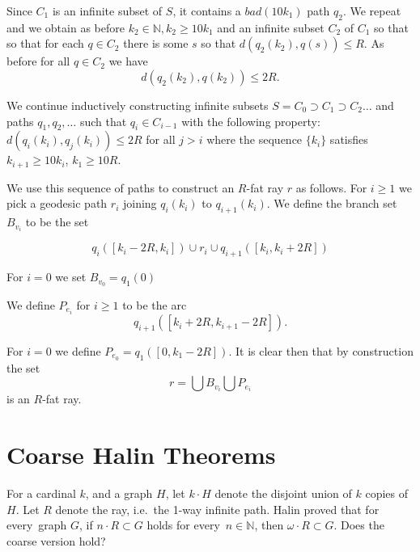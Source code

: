 \documentclass[a4paper]{article}
\newcommand{\comment}[1]{}
\newtheorem{lemma}[proposition]{Lemma}
\newcommand{\N}{\ensuremath{\mathbb N}}
\newcommand{\nin}{\ensuremath{{n\in\N}}}
\newcommand{\Lr}[1]{Lemma~\ref{#1}}
\newcommand{\Cnr}[1]{Con\-jecture~\ref{#1}}
\newcommand{\fe}{for every}
\begin{document}
{Since $C_1$ is an infinite subset of $S$, it contains a $bad(10k_1)$ path $q_2$. We repeat
and we obtain as before $k_2\in \mathbb N, k_2\geq 10k_1$ and an infinite subset $C_2$ of $C_1$ so that
so that for each $q\in C_2$ there is some $s$ so that
$d(q_2(k_2),q(s))\leq R$. As before for all $q\in C_2$ we have
$$d(q_2(k_2),q(k_2))\leq 2R.$$

We continue inductively constructing infinite subsets $S=C_0\supset C_1\supset C_2 \ldots$
and paths $q_1,q_2,\ldots$ such that $q_i\in C_{i-1}$  with the following property:
$d(q_i(k_i),q_j(k_i))\leq 2R$ for all $j>i$ where the sequence $\{k_i\}$ satisfies $k_{i+1}\geq 10k_i$, $k_1\geq 10R$.

We use this sequence of paths to construct an $R$-fat ray $r$ as follows. For $i\geq 1$ we pick a geodesic path $r_i$ joining $q_i(k_i)$ to $q_{i+1}(k_{i})$. We define the branch set $B_{v_i}$ to be the set 

$$q_i([k_i-2R,k_i])\cup r_i\cup q_{i+1}([k_{i},k_{i}+2R])$$

For $i=0$ we set $B_{v_0}=q_1(0)$

We define $P_{e_i}$ for $i\geq 1$ to be the arc
$$q_{i+1}([k_{i}+2R,k_{i+1}-2R]).$$

For $i=0$ we define $P_{e_0}=q_1([0,k_1-2R ])$.
It is clear then that by construction the set
$$r=\bigcup B_{v_i} \bigcup P_{e_i}$$ is an $R$-fat ray.
} 

\comment{
A potential approach towards \Cnr{Cnr Konig} is to take, \fe\ $K\in \N$, a $K$-net $G_n$ in $X$, and apply the following to $G_n$:
\begin{lemma} \label{lem}
Let $G$ be a (connected) graph of infinite diameter. Then $G$ contains the ray or $\bigvee P_n$ as a subgraph.
\end{lemma}
\begin{proof}\textcolor{red}{TOPROVE 13}\end{proof}

But I cannot yet use \Lr{lem} to prove \Cnr{Cnr Konig}.
}

\section{Coarse Halin Theorems} \label{sec Halin}

For a cardinal $k$, and a graph $H$, let $k \cdot H$ denote the disjoint union of $k$ copies of $H$. Let $R$ denote the ray, i.e.\ the 1-way infinite path. Halin \cite{halin65} proved that \fe\ graph $G$, if $n\cdot R \subset G$ holds \fe\ $\nin$, then $\omega \cdot R \subset G$. Does the coarse version hold?
\end{document}
